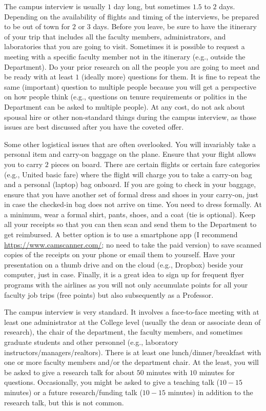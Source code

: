 \documentclass[14pt]{article}
\def\bluehref#1#2{\href{#1}{\color{blue} #2}}
\begin{document}
The campus interview is usually $1$ day long, but sometimes $1.5$ to $2$ days. Depending on the availability of flights and timing of the interviews, be prepared to be out of town for $2$ or $3$ days. Before you leave, be sure to have the itinerary of your trip that includes all the faculty members, administrators, and laboratories that you are going to visit. Sometimes it is possible to request a meeting with a specific faculty member not in the itinerary (e.g., outside the Department).
Do your prior research on all the people you are going to meet and be ready with at least $1$ (ideally more) questions for them. It is fine to repeat the same (important) question to multiple people because you will get a perspective on how people think (e.g., questions on tenure requirements or politics in the Department can be asked to multiple people). At any cost, do not ask about spousal hire or other non-standard things during the campus interview, as those issues are best discussed after you have the coveted offer. 

Some other logistical issues that are often overlooked. You will invariably take a personal item and carry-on baggage on the plane. Ensure that your flight allows you to carry $2$ pieces on board. There are certain flights or certain fare categories (e.g., United basic fare) where the flight will charge you to take a carry-on bag and a personal (laptop) bag onboard. If you are going to check in your baggage, ensure that you have another set of formal dress and shoes in your carry-on, just in case the checked-in bag does not arrive on time. You need to dress formally. At a minimum, wear a formal shirt, pants, shoes, and a coat (tie is optional). Keep all your receipts so that you can then scan and send them to the Department to get reimbursed. A better option is to use a smartphone app (I recommend \bluehref{https://www.camscanner.com/}{https://www.camscanner.com/}; no need to take the paid version) to save scanned copies of the receipts on your phone or email them to yourself. Have your presentation on a thumb drive and on the cloud (e.g., Dropbox) beside your computer, just in case. Finally, it is a great idea to sign up for frequent flyer programs with the airlines as you will not only accumulate points for all your faculty job trips (free points) but also subsequently as a Professor. 

The campus interview is very standard. It involves a face-to-face meeting with at least one administrator at the College level (usually the dean or associate dean of research), the chair of the department, the faculty members, and sometimes graduate students and other personnel (e.g., laboratory instructors/managers/realtors). There is at least one lunch/dinner/breakfast with one or more faculty members and/or the department chair. At the least, you will be asked to give a research talk for about $50$ minutes with $10$ minutes for questions. Occasionally, you might be asked to give a teaching talk ($10-15$ minutes) or a future research/funding talk ($10-15$ minutes) in addition to the research talk, but this is not common. 
\end{document}

